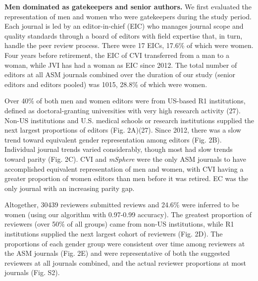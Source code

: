 \documentclass[11pt,]{article}
\begin{document}
\textbf{Men dominated as gatekeepers and senior authors.} We first
evaluated the representation of men and women who were gatekeepers
during the study period. Each journal is led by an editor-in-chief (EIC)
who manages journal scope and quality standards through a board of
editors with field expertise that, in turn, handle the peer review
process. There were 17 EICs, 17.6\% of which were women. Four years
before retirement, the EIC of CVI transferred from a man to a woman,
while JVI has had a woman as EIC since 2012. The total number of editors
at all ASM journals combined over the duration of our study (senior
editors and editors pooled) was 1015, 28.8\% of which were women.

Over 40\% of both men and women editors were from US-based R1
institutions, defined as doctoral-granting universities with very high
research activity (27). Non-US institutions and U.S. medical schools or
research institutions supplied the next largest proportions of editors
(Fig. 2A)(27). Since 2012, there was a slow trend toward equivalent
gender representation among editors (Fig. 2B). Individual journal trends
varied considerably, though most had slow trends toward parity (Fig.
2C). CVI and \emph{mSphere} were the only ASM journals to have
accomplished equivalent representation of men and women, with CVI having
a greater proportion of women editors than men before it was retired. EC
was the only journal with an increasing parity gap.

Altogether, 30439 reviewers submitted reviews and 24.6\% were inferred
to be women (using our algorithm with 0.97-0.99 accuracy). The greatest
proportion of reviewers (over 50\% of all groups) came from non-US
institutions, while R1 institutions supplied the next largest cohort of
reviewers (Fig. 2D). The proportions of each gender group were
consistent over time among reviewers at the ASM journals (Fig. 2E) and
were representative of both the suggested reviewers at all journals
combined, and the actual reviewer proportions at most journals (Fig.
S2).
\end{document}
